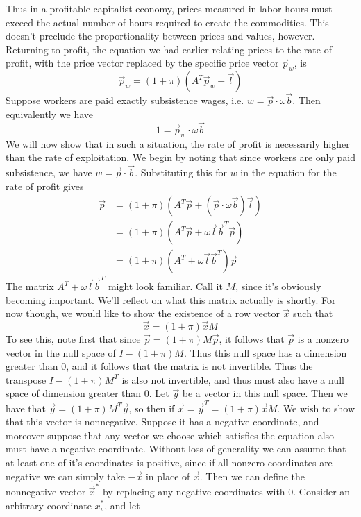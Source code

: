 \documentclass{article}
\theoremstyle{definition}
\theoremstyle{plain}
\theoremstyle{theorem}
\begin{document}
Thus in a profitable capitalist economy, prices measured in labor hours must exceed the actual number of hours required to create the commodities. This doesn't preclude the proportionality between prices and values, however. Returning to profit, the equation we had earlier relating prices to the rate of profit, with the price vector replaced by the specific price vector $\vec{p}_w$, is
\[ \vec{p}_w = (1+\pi)(A^T\vec{p}_w + \vec{l}) \]
Suppose workers are paid exactly subsistence wages, i.e. $w = \vec{p} \cdot \omega\vec{b}$. Then equivalently we have
\[ 1 = \vec{p}_w \cdot \omega \vec{b} \]
We will now show that in such a situation, the rate of profit is necessarily higher than the rate of exploitation. We begin by noting that since workers are only paid subsistence, we have $w = \vec{p}\cdot\vec{b}$. Substituting this for $w$ in the equation for the rate of profit gives
\begin{align*}
 \vec{p} &= (1+\pi)(A^T\vec{p} + (\vec{p}\cdot \omega\vec{b})\vec{l}) \\
 	&= (1+\pi)(A^T\vec{p} + \omega\vec{l}\vec{b}^T\vec{p}) \\
 	&= (1+\pi)(A^T + \omega\vec{l}\vec{b}^T)\vec{p}
\end{align*} 
The matrix $A^T + \omega\vec{l}\vec{b}^T$ might look familiar. Call it $M$, since it's obviously becoming important. We'll reflect on what this matrix actually is shortly. For now though, we would like to show the existence of a row vector $\vec{x}$ such that 
\[ \vec{x} = (1+\pi)\vec{x}M \]
To see this, note first that since $\vec{p} = (1+\pi)M\vec{p}$, it follows that $\vec{p}$ is a nonzero vector in the null space of $I-(1+\pi)M$. Thus this null space has a dimension greater than $0$, and it follows that the matrix is not invertible. Thus the transpose $I-(1+\pi)M^T$ is also not invertible, and thus must also have a null space of dimension greater than $0$. Let $\vec{y}$ be a vector in this null space. Then we have that $\vec{y} = (1+\pi)M^T\vec{y}$, so then if $\vec{x} = \vec{y}^T = (1+\pi)\vec{x}M$. We wish to show that this vector is nonnegative. Suppose it has a negative coordinate, and moreover suppose that any vector we choose which satisfies the equation also must have a negative coordinate. Without loss of generality we can assume that at least one of it's coordinates is positive, since if all nonzero coordinates are negative we can simply take $-\vec{x}$ in place of $\vec{x}$. Then we can define the nonnegative vector $\vec{x}^*$ by replacing any negative coordinates with $0$. Consider an arbitrary coordinate $x^*_i$, and let 
\end{document}
